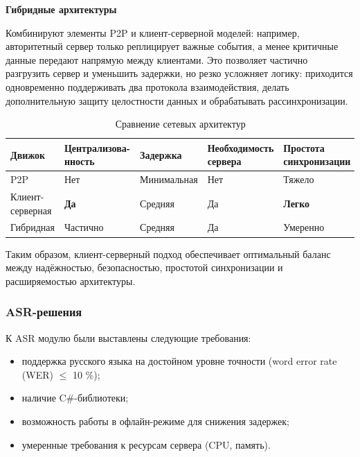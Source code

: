         \textbf{Гибридные архитектуры}

        Комбинируют элементы P2P и клиент-серверной моделей: например, авторитетный сервер только реплицирует важные события, а менее критичные данные 
        передают напрямую между клиентами. Это позволяет частично разгрузить сервер и уменьшить задержки, но резко усложняет логику: приходится одновременно поддерживать два протокола 
        взаимодействия, делать дополнительную защиту целостности данных и обрабатывать рассинхронизации.

        \begin{table}[ht]
            \caption{Сравнение сетевых архитектур}
            \centering
            \begingroup
            \fontsize{12}{14}\selectfont
            \renewcommand{\arraystretch}{1.2}
            \renewcommand{\tablename}{Табл.}
            \begin{tabularx}{\textwidth}{|X|X|X|X|X|}
            \hline
            \textbf{Движок}&\textbf{Централизова-нность} & \textbf{Задержка} & \textbf{Необходимость сервера}&\textbf{Простота синхронизации}\\
            \hline
            P2P&Нет&Минимальная&Нет&Тяжело\\
            \hline
            Клиент-серверная&\textbf{Да}&Средняя&Да&\textbf{Легко}\\
            \hline
            Гибридная&Частично&Средняя&Да&Умеренно\\
            \hline
            \end{tabularx}
            \endgroup
        \end{table}
        
        Таким образом, клиент-серверный подход обеспечивает оптимальный баланс между надёжностью, безопасностью, простотой синхронизации и расширяемостью архитектуры.

        \subsubsection{ASR-решения}

        К ASR модулю были выставлены следующие требования:
        \begin{itemize}
            \item поддержка русского языка на достойном уровне точности (word error rate (WER) $\leq$ 10 \%);
            \item наличие C\#-библиотеки;
            \item возможность работы в офлайн-режиме для снижения задержек;
            \item умеренные требования к ресурсам сервера (CPU, память).
        \end{itemize}

